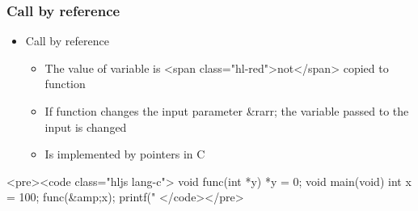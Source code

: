 \documentclass{../c-lecture}
\begin{document}
\begin{frame}
  \frametitle{Call by reference}
  \begin{itemize}
    \item Call by reference
    \begin{itemize}
      \item
        The value of variable is <span class="hl-red">not</span> copied to
        function

      \item
        If function changes the input parameter &rarr; the variable passed to
        the input is changed

      \item Is implemented by pointers in C
    \end{itemize}
  \end{itemize}
  <pre><code class="hljs lang-c">
void func(int *y){
  *y = 0;
}
void main(void){
  int x = 100;
  func(&amp;x);
  printf("%
}
  </code></pre>
\end{frame}
\end{document}
